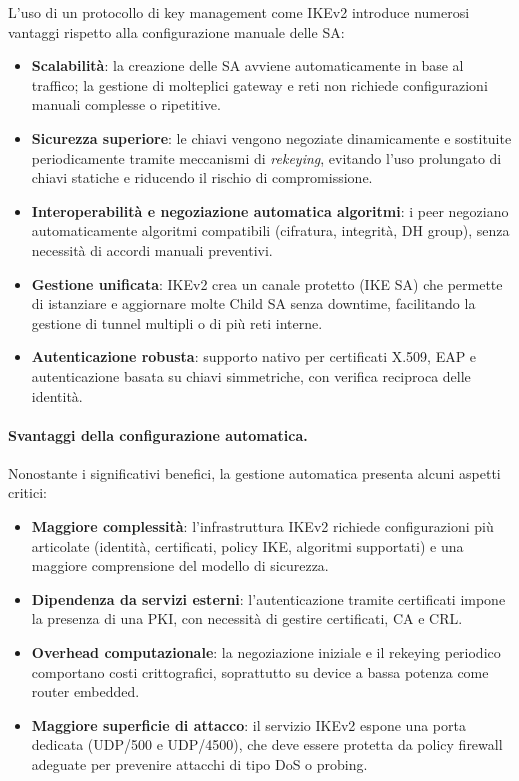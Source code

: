 L’uso di un protocollo di key management come IKEv2 introduce numerosi vantaggi rispetto
alla configurazione manuale delle SA:

\begin{itemize}
    \item \textbf{Scalabilità}: la creazione delle SA avviene automaticamente in base al traffico;
          la gestione di molteplici gateway e reti non richiede configurazioni manuali
          complesse o ripetitive.
    \item \textbf{Sicurezza superiore}: le chiavi vengono negoziate dinamicamente e
          sostituite periodicamente tramite meccanismi di \emph{rekeying}, evitando l’uso
          prolungato di chiavi statiche e riducendo il rischio di compromissione.
    \item \textbf{Interoperabilità e negoziazione automatica algoritmi}: i peer negoziano
          automaticamente algoritmi compatibili (cifratura, integrità, DH group), senza
          necessità di accordi manuali preventivi.
    \item \textbf{Gestione unificata}: IKEv2 crea un canale protetto (IKE SA) che permette
          di istanziare e aggiornare molte Child SA senza downtime, facilitando la gestione
          di tunnel multipli o di più reti interne.
    \item \textbf{Autenticazione robusta}: supporto nativo per certificati X.509, EAP e
          autenticazione basata su chiavi simmetriche, con verifica reciproca delle identità.
\end{itemize}

\paragraph{Svantaggi della configurazione automatica.}

Nonostante i significativi benefici, la gestione automatica presenta alcuni aspetti critici:

\begin{itemize}
    \item \textbf{Maggiore complessità}: l’infrastruttura IKEv2 richiede configurazioni più
          articolate (identità, certificati, policy IKE, algoritmi supportati) e una maggiore
          comprensione del modello di sicurezza.
    \item \textbf{Dipendenza da servizi esterni}: l’autenticazione tramite certificati impone
          la presenza di una PKI, con necessità di gestire certificati, CA e CRL.
    \item \textbf{Overhead computazionale}: la negoziazione iniziale e il rekeying
          periodico comportano costi crittografici, soprattutto su device a bassa potenza come
          router embedded.
    \item \textbf{Maggiore superficie di attacco}: il servizio IKEv2 espone una porta
          dedicata (UDP/500 e UDP/4500), che deve essere protetta da policy firewall
          adeguate per prevenire attacchi di tipo DoS o probing.
\end{itemize}


